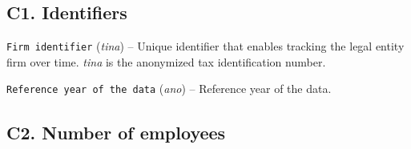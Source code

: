 \documentclass[]{book}
\begin{document}
\hypertarget{c1.-identifiers}{%
\subsection{C1. Identifiers}\label{c1.-identifiers}}

\texttt{Firm\ identifier} (\emph{tina}) -- Unique identifier that enables tracking the legal entity firm over time. \emph{tina} is the anonymized tax identification number.

\texttt{Reference\ year\ of\ the\ data} (\emph{ano}) -- Reference year of the data.

\hypertarget{c2.-number-of-employees}{%
\subsection{C2. Number of employees}\label{c2.-number-of-employees}}
\end{document}
